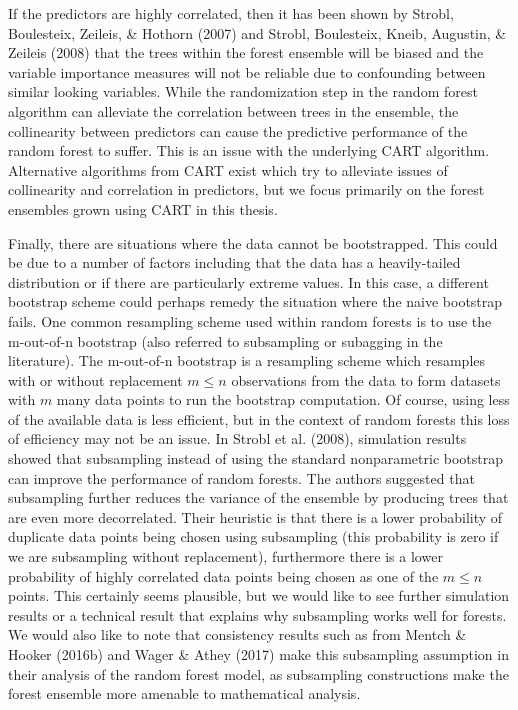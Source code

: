\documentclass[12pt,twoside]{reedthesis}
\theoremstyle{definition}
\theoremstyle{definition}
\theoremstyle{definition}
\theoremstyle{remark}
\begin{document}
If the predictors are highly correlated, then it has been shown by
Strobl, Boulesteix, Zeileis, \& Hothorn (2007) and Strobl, Boulesteix,
Kneib, Augustin, \& Zeileis (2008) that the trees within the forest
ensemble will be biased and the variable importance measures will not be
reliable due to confounding between similar looking variables. While the
randomization step in the random forest algorithm can alleviate the
correlation between trees in the ensemble, the collinearity between
predictors can cause the predictive performance of the random forest to
suffer. This is an issue with the underlying CART algorithm. Alternative
algorithms from CART exist which try to alleviate issues of collinearity
and correlation in predictors, but we focus primarily on the forest
ensembles grown using CART in this thesis. \par

Finally, there are situations where the data cannot be bootstrapped.
This could be due to a number of factors including that the data has a
heavily-tailed distribution or if there are particularly extreme values.
In this case, a different bootstrap scheme could perhaps remedy the
situation where the naive bootstrap fails. One common resampling scheme
used within random forests is to use the m-out-of-n bootstrap (also
referred to subsampling or subagging in the literature). The m-out-of-n
bootstrap is a resampling scheme which resamples with or without
replacement \(m\leq n\) observations from the data to form datasets with
\(m\) many data points to run the bootstrap computation. Of course,
using less of the available data is less efficient, but in the context
of random forests this loss of efficiency may not be an issue. In Strobl
et al. (2008), simulation results showed that subsampling instead of
using the standard nonparametric bootstrap can improve the performance
of random forests. The authors suggested that subsampling further
reduces the variance of the ensemble by producing trees that are even
more decorrelated. Their heuristic is that there is a lower probability
of duplicate data points being chosen using subsampling (this
probability is zero if we are subsampling without replacement),
furthermore there is a lower probability of highly correlated data
points being chosen as one of the \(m\leq n\) points. This certainly
seems plausible, but we would like to see further simulation results or
a technical result that explains why subsampling works well for forests.
We would also like to note that consistency results such as from Mentch
\& Hooker (2016b) and Wager \& Athey (2017) make this subsampling
assumption in their analysis of the random forest model, as subsampling
constructions make the forest ensemble more amenable to mathematical
analysis. \par
\end{document}
